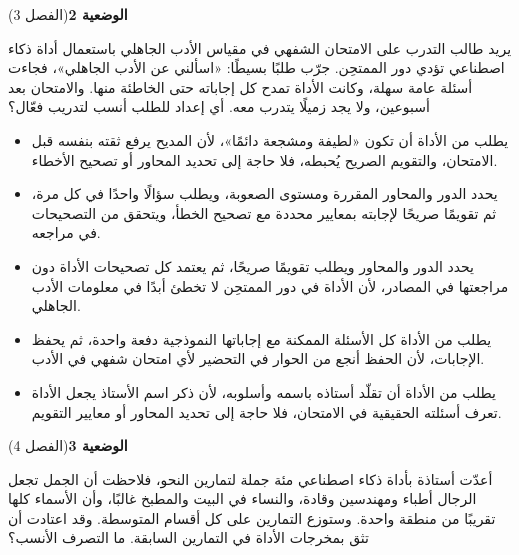 \documentclass[11pt,a4paper]{article}
\begin{document}
\par\vspace{6pt}
\noindent
{\large\khatt\textbf{الوضعية 2}}\hfill{\small(الفصل 3)}\par\nopagebreak\vspace{3pt}
\setlength{\fboxsep}{7pt}\colorbox{gray!10}{\parbox{\dimexpr\linewidth-14pt}{يريد طالب التدرب على الامتحان الشفهي في مقياس الأدب الجاهلي باستعمال أداة ذكاء اصطناعي تؤدي دور الممتحِن. جرّب طلبًا بسيطًا: «اسألني عن الأدب الجاهلي»، فجاءت أسئلة عامة سهلة، وكانت الأداة تمدح كل إجاباته حتى الخاطئة منها. والامتحان بعد أسبوعين، ولا يجد زميلًا يتدرب معه. أي إعداد للطلب أنسب لتدريب فعّال؟}}\par\nopagebreak
\begin{itemize}[leftmargin=1.0cm, labelsep=6pt, itemsep=3pt, topsep=4pt, parsep=0pt]
  \item[\textbf{أ)}] يطلب من الأداة أن تكون «لطيفة ومشجعة دائمًا»، لأن المديح يرفع ثقته بنفسه قبل الامتحان، والتقويم الصريح يُحبطه، فلا حاجة إلى تحديد المحاور أو تصحيح الأخطاء.
  \item[\textbf{ب)}] يحدد الدور والمحاور المقررة ومستوى الصعوبة، ويطلب سؤالًا واحدًا في كل مرة، ثم تقويمًا صريحًا لإجابته بمعايير محددة مع تصحيح الخطأ، ويتحقق من التصحيحات في مراجعه.
  \item[\textbf{ج)}] يحدد الدور والمحاور ويطلب تقويمًا صريحًا، ثم يعتمد كل تصحيحات الأداة دون مراجعتها في المصادر، لأن الأداة في دور الممتحِن لا تخطئ أبدًا في معلومات الأدب الجاهلي.
  \item[\textbf{د)}] يطلب من الأداة كل الأسئلة الممكنة مع إجاباتها النموذجية دفعة واحدة، ثم يحفظ الإجابات، لأن الحفظ أنجع من الحوار في التحضير لأي امتحان شفهي في الأدب.
  \item[\textbf{هـ)}] يطلب من الأداة أن تقلّد أستاذه باسمه وأسلوبه، لأن ذكر اسم الأستاذ يجعل الأداة تعرف أسئلته الحقيقية في الامتحان، فلا حاجة إلى تحديد المحاور أو معايير التقويم.
\end{itemize}
\par\vspace{6pt}
\noindent
{\large\khatt\textbf{الوضعية 3}}\hfill{\small(الفصل 4)}\par\nopagebreak\vspace{3pt}
\setlength{\fboxsep}{7pt}\colorbox{gray!10}{\parbox{\dimexpr\linewidth-14pt}{أعدّت أستاذة بأداة ذكاء اصطناعي مئة جملة لتمارين النحو، فلاحظت أن الجمل تجعل الرجال أطباء ومهندسين وقادة، والنساء في البيت والمطبخ غالبًا، وأن الأسماء كلها تقريبًا من منطقة واحدة. وستوزع التمارين على كل أقسام المتوسطة. وقد اعتادت أن تثق بمخرجات الأداة في التمارين السابقة. ما التصرف الأنسب؟}}\par\nopagebreak
\end{document}
